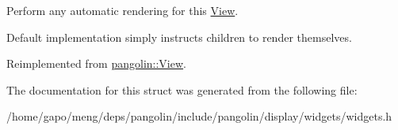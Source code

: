 Perform any automatic rendering for this \hyperlink{structpangolin_1_1_view}{View}. 

Default implementation simply instructs children to render themselves. 

Reimplemented from \hyperlink{structpangolin_1_1_view_a15bf43d7ebc4ebe4e02cba572f0d49ba}{pangolin\+::\+View}.



The documentation for this struct was generated from the following file\+:\begin{DoxyCompactItemize}
\item 
/home/gapo/meng/deps/pangolin/include/pangolin/display/widgets/widgets.\+h\end{DoxyCompactItemize}
